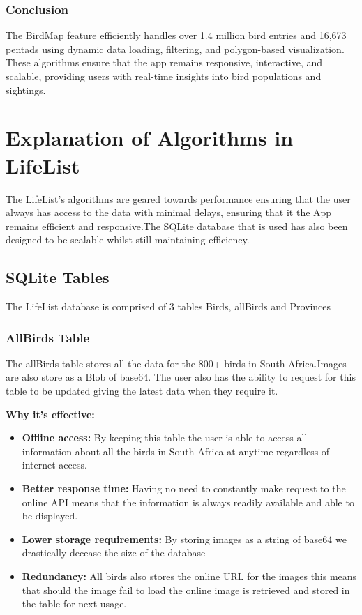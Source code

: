\documentclass{article}
\begin{document}
\subsubsection{Conclusion}
The BirdMap feature efficiently handles over 1.4 million bird entries and 16,673 pentads using dynamic data loading, filtering, and polygon-based visualization. These algorithms ensure that the app remains responsive, interactive, and scalable, providing users with real-time insights into bird populations and sightings.

\section{Explanation of Algorithms in LifeList}
The LifeList's algorithms are geared towards performance ensuring that the user always has access to the data with minimal delays, ensuring that it the App remains efficient and responsive.The SQLite database that is used has also been designed to be scalable whilst still maintaining efficiency. 

\subsection{SQLite Tables}
The LifeList database is comprised of 3 tables Birds, allBirds and Provinces

\subsubsection{AllBirds Table}
The allBirds table stores all the data for the 800+ birds in South Africa.Images are also store as a Blob of base64. The user also has the ability to request for this table to be updated giving the latest data when they require it.

\textbf{Why it's effective:}
\begin{itemize}
    \item \textbf{Offline access:} By keeping this table the user is able to access all information about all the birds in South Africa at anytime regardless of internet access.
    \item \textbf{Better response time:} Having no need to constantly make request to the online API means that the information is always readily available and able to be displayed.
    \item \textbf{Lower storage requirements:} By storing images as a string of base64 we drastically decease the size of the database 
    \item \textbf{Redundancy:} All birds also stores the online URL for the images this means that should the image fail to load the online image is retrieved and stored in the table for next usage.
\end{itemize}
\end{document}
